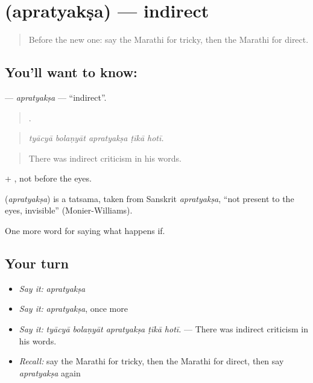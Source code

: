 \section[\texorpdfstring{\mr{अप्रत्यक्ष} (apratyakṣa)}{अप्रत्यक्ष (apratyakṣa)}]{ (apratyakṣa) — indirect}

\label{lesson:MR-C395-apratyaksa}



\begin{quote}
Before the new one: say the Marathi for tricky, then the Marathi for direct.
\end{quote}

\subsection*{You'll want to know: }
\textbf{} — \emph{apratyakṣa} — \textquotedblleft{}indirect\textquotedblright{}.

\begin{quote}
    .
\end{quote}

\begin{quote}
\emph{tyācyā bolaṇyāt apratyakṣa ṭīkā hotī.}
\end{quote}

\begin{quote}
There was indirect criticism in his words.
\end{quote}

 + , not before the eyes.

\begin{cousinweb}
\textbf{} (\emph{apratyakṣa}) is a tatsama, taken from Sanskrit \emph{apratyakṣa}, \textquotedblleft{}not present to the eyes, invisible\textquotedblright{} (Monier-Williams).
\end{cousinweb}

\begin{grammarlens}[title={What you've built}]
One more word for saying what happens if.
\end{grammarlens}

\subsection*{Your turn}
\begin{itemize}
\raggedright
  \item \emph{Say it:} \emph{apratyakṣa}
  \item \emph{Say it:} \emph{apratyakṣa}, once more
  \item \emph{Say it:} \emph{tyācyā bolaṇyāt apratyakṣa ṭīkā hotī.} — There was indirect criticism in his words.
  \item \emph{Recall:} say the Marathi for tricky, then the Marathi for direct, then say \emph{apratyakṣa} again
\end{itemize}

